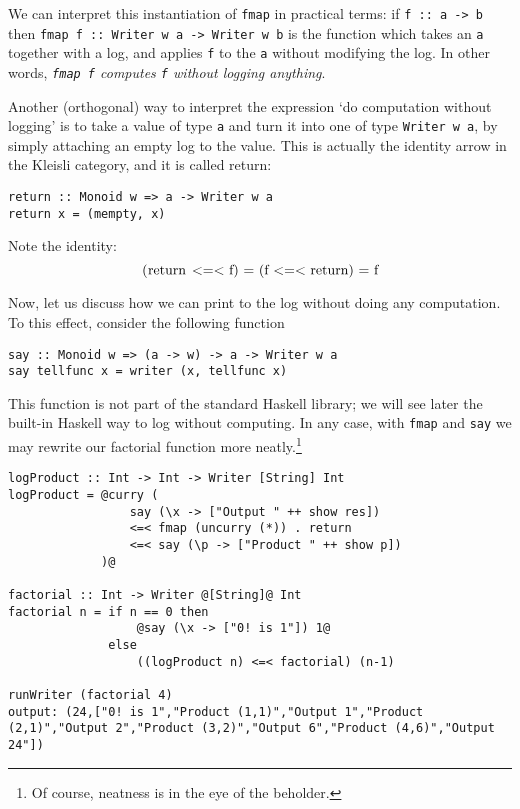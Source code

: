 \documentclass[11	pt]{article}
\theoremstyle{nonumberplain}
\newcommand*\lsin{\lstinline}
\newcommand*\lsmath[1]{\text{\lstinline|#1|}}
\begin{document}
We can interpret this instantiation of \lsin|fmap| in practical terms: if \lsin|f :: a -> b| then \lsin|fmap f :: Writer w a -> Writer w b| is the function which takes an \lsin|a| together with a log, and applies \lsin|f| to the \lsin|a| without modifying the log. In other words, \emph{\lsin|fmap f| computes \lsin|f| without logging anything}.

\smallskip

Another (orthogonal) way to interpret the expression `do computation without logging' is to take a value of type \lsin|a| and turn it into one of type \lsin|Writer w a|, by simply attaching an empty log to the value. This is actually the identity arrow in the Kleisli category, and it is called return:
\begin{lstlisting}
return :: Monoid w => a -> Writer w a
return x = (mempty, x)
\end{lstlisting}

Note the identity:
\begin{equation}
\lsmath{(return <=< f) = (f <=< return) = f}
\end{equation}

\smallskip

Now, let us discuss how we can print to the log without doing any computation. To this effect, consider the following function
\begin{lstlisting}
say :: Monoid w => (a -> w) -> a -> Writer w a
say tellfunc x = writer (x, tellfunc x)
\end{lstlisting}

This function is not part of the standard Haskell library; we will see later the built-in Haskell way to log without computing. In any case, with \lsin|fmap| and \lsin|say| we may rewrite our factorial function more neatly.\footnote{Of course, neatness is in the eye of the beholder.}
\begin{lstlisting}
logProduct :: Int -> Int -> Writer [String] Int
logProduct = @curry (
                 say (\x -> ["Output " ++ show res])
                 <=< fmap (uncurry (*)) . return
                 <=< say (\p -> ["Product " ++ show p])
             )@

factorial :: Int -> Writer @[String]@ Int
factorial n = if n == 0 then
                  @say (\x -> ["0! is 1"]) 1@
              else
                  ((logProduct n) <=< factorial) (n-1)

runWriter (factorial 4)
output: (24,["0! is 1","Product (1,1)","Output 1","Product (2,1)","Output 2","Product (3,2)","Output 6","Product (4,6)","Output 24"])
\end{lstlisting}
\end{document}
